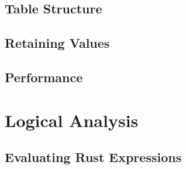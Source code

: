 
\subsection{Table Structure}






\subsection{Retaining Values}


\subsection{Performance}

\section{Logical Analysis}

\subsection{Evaluating Rust Expressions}

